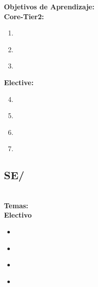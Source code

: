 \noindent \textbf{Objetivos de Aprendizaje:}\\
\noindent \textbf{Core-Tier2:}
\begin{enumerate}
	\setcounter{enumi}{0}
	\item \SESoftwareReliabilityLOExplainTheExist\xspace[\SESoftwareReliabilityLOExplainTheExistLevel]\label{sec:BOK:SESoftwareReliabilityLOExplainTheExist}
	\item \SESoftwareReliabilityLODescribeHowContributes\xspace[\SESoftwareReliabilityLODescribeHowContributesLevel]\label{sec:BOK:SESoftwareReliabilityLODescribeHowContributes}
	\item \SESoftwareReliabilityLOListApproaches\xspace[\SESoftwareReliabilityLOListApproachesLevel]\label{sec:BOK:SESoftwareReliabilityLOListApproaches}
\end{enumerate}
\noindent \textbf{Elective:}
\begin{enumerate}
	\setcounter{enumi}{3}
	\item \SESoftwareReliabilityLOCompareTheThree\xspace[\SESoftwareReliabilityLOCompareTheThreeLevel]\label{sec:BOK:SESoftwareReliabilityLOCompareTheThree}
	\item \SESoftwareReliabilityLODemonstrateTheApply\xspace[\SESoftwareReliabilityLODemonstrateTheApplyLevel]\label{sec:BOK:SESoftwareReliabilityLODemonstrateTheApply}
	\item \SESoftwareReliabilityLOIdentifyMethods\xspace[\SESoftwareReliabilityLOIdentifyMethodsLevel]\label{sec:BOK:SESoftwareReliabilityLOIdentifyMethods}
	\item \SESoftwareReliabilityLOIdentifyWaysRedundancy\xspace[\SESoftwareReliabilityLOIdentifyWaysRedundancyLevel]\label{sec:BOK:SESoftwareReliabilityLOIdentifyWaysRedundancy}
\end{enumerate}


\subsection{SE/\SEFormalMethods}\label{sec:BOK:SEFormalMethods}
\SEFormalMethodsDescription\\
\noindent \textbf{Temas:}\\
\noindent \textbf{Electivo}
\begin{itemize}
	\item \SEFormalMethodsTopicRole\label{sec:BOK:SEFormalMethodsTopicRole}
	\item \SEFormalMethodsTopicProgram\label{sec:BOK:SEFormalMethodsTopicProgram}
	\item \SEFormalMethodsTopicFormal\label{sec:BOK:SEFormalMethodsTopicFormal}
	\item \SEFormalMethodsTopicTools\label{sec:BOK:SEFormalMethodsTopicTools}
\end{itemize}


